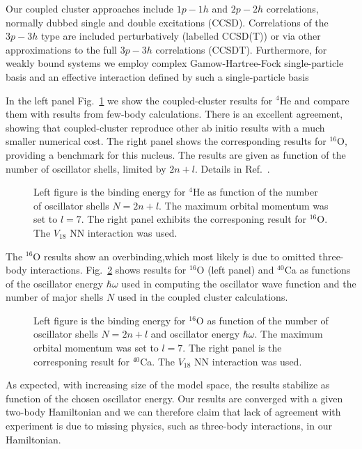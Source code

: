 \documentclass{ws-procs975x65}
\begin{document}
Our coupled cluster approaches include $1p-1h$ and $2p-2h$ correlations, normally dubbed 
single and double excitations (CCSD). Correlations of the $3p-3h$ type are included perturbatively
(labelled CCSD(T)) or via other approximations to the full $3p-3h$ correlations (CCSDT). 
Furthermore, for weakly bound systems we employ  complex Gamow-Hartree-Fock single-particle basis and an effective 
interaction  defined by such a single-particle basis \cite{hagen1,hagen2}

In the left panel Fig.~\ref{fig:he4} we show the coupled-cluster results 
for $^4$He and compare them with results from
few-body calculations. There is an excellent agreement, showing that coupled-cluster reproduce other
ab initio results with a much smaller numerical cost.  The right panel shows the corresponding results for
$^{16}$O, providing a benchmark for this nucleus. The results are given as function of the number of oscillator
shells, limited by $2n+l$.   Details in Ref.~\cite{hagen2}.
\begin{figure}[b]%
\begin{center}
  \parbox{2.1in}{}
  \hspace*{4pt}
  \parbox{2.1in}{}
  \caption{Left figure is the binding energy for $^4$He as function of the number of oscillator shells $N=2n+l$.
The maximum orbital momentum was set to $l=7$. 
The right panel exhibits the corresponing result for $^{16}$O. The $V_{18}$ NN interaction was used.}%
  \label{fig:he4}
\end{center}
\end{figure}
The $^{16}$O results show an overbinding,which most likely is due to omitted three-body interactions.
Fig.~\ref{fig:ox16} shows results for $^{16}$O (left panel) and $^{40}$Ca as functions of the oscillator
energy $\hbar\omega$ used in computing the oscillator wave function and the number of major shells $N$
used in the coupled cluster calculations. 
\begin{figure}[b]%
\begin{center}
  \parbox{2.1in}{}
  \hspace*{4pt}
  \parbox{2.1in}{}
  \caption{Left figure is the binding energy for $^{16}$O as function of the number of oscillator shells $N=2n+l$ and oscillator energy $\hbar\omega$. The maximum orbital momentum was set to $l=7$. 
The right panel is the corresponing result for $^{40}$Ca. The $V_{18}$ NN interaction was used.}%
  \label{fig:ox16}
\end{center}
\end{figure}
As expected, with increasing size of the model space, the results stabilize as function of the 
chosen oscillator energy.  Our results are converged with a given two-body Hamiltonian and we can therefore claim
that lack of agreement with experiment is due to missing physics, such as three-body interactions, in our Hamiltonian.
\end{document}
